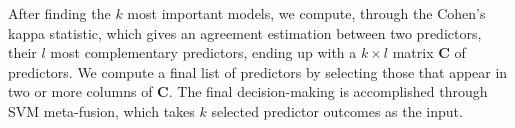 After finding the $k$ most important models, we compute, through the Cohen's kappa statistic, which gives an agreement estimation between two predictors, their $l$ most complementary predictors, ending up with a $k \times l$ matrix $\mathbf{C}$ of predictors. 
We compute a final list of predictors by selecting those that appear in two or more columns of $\mathbf{C}$. The final decision-making is accomplished through SVM meta-fusion, which takes $k$ selected predictor outcomes as the input.